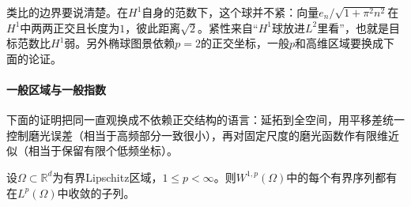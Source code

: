 类比的边界要说清楚。在$H^1$自身的范数下，这个球并不紧：向量$e_n/\sqrt{1+\pi^2n^2}$在$H^1$中两两正交且长度为$1$，彼此距离$\sqrt2$。紧性来自“$H^1$球放进$L^2$里看”，也就是目标范数比$H^1$弱。另外椭球图景依赖$p=2$的正交坐标，一般$p$和高维区域要换成下面的论证。

\paragraph{一般区域与一般指数}
下面的证明把同一直观换成不依赖正交结构的语言：延拓到全空间，用平移差统一控制磨光误差（相当于高频部分一致很小），再对固定尺度的磨光函数作有限维近似（相当于保留有限个低频坐标）。

\begin{lemma}
\label{lem:sobolev-rellich-lp}
设$\Omega\subset\mathbb R^d$为有界Lipschitz区域，$1\leq p<\infty$。则$W^{1,p}(\Omega)$中的每个有界序列都有在$L^p(\Omega)$中收敛的子列。
\end{lemma}

